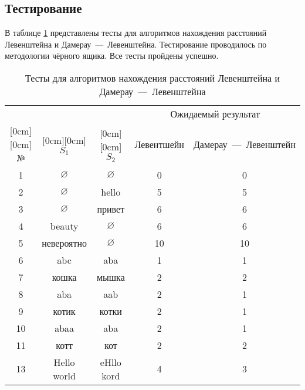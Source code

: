 \subsection{Тестирование}

В таблице \ref{table:tests} представлены тесты для алгоритмов нахождения расстояний Левенштейна и Дамерау~---~Левенштейна. Тестирование проводилось по методологии чёрного ящика. Все тесты пройдены успешно.

\begin{table}[htb]
\caption{\centering Тесты для алгоритмов нахождения расстояний Левенштейна и Дамерау~---~Левенштейна}
\small
\centering\begin{tabular}{|c|c|c|c|c|}
      \hline
       &  &  & \multicolumn{2}{c|}{Ожидаемый результат} \\
      \cline{4-5}
      \raisebox{1.5ex}[0cm][0cm]{№} & \raisebox{1.5ex}[0cm][0cm]{$S_1$} & \raisebox{1.5ex}[0cm][0cm]{$S_2$} 
      &  Левентшейн & Дамерау~---~Левенштейн \\ \hline
      1 & $\varnothing$ & $\varnothing$ & 0 & 0 \\ \hline
      2 & $\varnothing$ & hello & 5 & 5 \\ \hline
      3 & $\varnothing$ & привет & 6 & 6 \\ \hline
      4 & beauty & $\varnothing$ & 6 & 6 \\ \hline
      5 & невероятно & $\varnothing$ & 10 & 10 \\ \hline
      6 & abc & aba & 1 & 1 \\ \hline
      7 & кошка & мышка & 2 & 2 \\ \hline
      8 & aba & aab & 2 & 1 \\ \hline
      9 & котик & котки & 2 & 1 \\ \hline
      10 & abaa & aba & 2 & 1 \\ \hline
      11 & котт & кот & 2 & 2 \\ \hline
      13 & Hello world & eHllo kord & 4 & 3 \\ \hline
    \end{tabular}
\label{table:tests}
\end{table}
